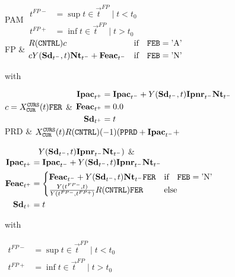 \documentclass[12pt]{book}
\begin{document}
\begin{functions}{PAM}
	{$\begin{aligned}
				t^{FP-} & = \sup t \in \vec{t}^{FP}\mid t<t_0 \\
				t^{FP+} & = \inf t \in \vec{t}^{FP}\mid t>t_0\end{aligned}$} \\
	\hline
	FP & {$\begin{aligned}
					 & R (\texttt{CNTRL}) c                                                  & \text{if} \quad \texttt{FEB}=\text{'A'} \\
					 & cY (\textbf{Sd}_{t^-},t)\textbf{Nt}_{t^-}+\textbf{Feac}_{t^-} & \text{if} \quad \texttt{FEB}=\text{'N'}\end{aligned}$}\par
	with\par
	$c=X_{\texttt{CUR}}^{\texttt{CURS}}(t)\texttt{FER}$
	& {$\begin{aligned}
					\textbf{Ipac}_{t^+} & = \textbf{Ipac}_{t^-} + Y (\textbf{Sd}_{t^-},t)\textbf{Ipnr}_{t^-}\textbf{Nt}_{t^-} \\
					\textbf{Feac}_{t^+} & = 0.0                                                                      \\
					\textbf{Sd}_{t^+}   & = t\end{aligned}$} \\
	\hline
	PRD & $X_{\texttt{CUR}}^{\texttt{CURS}}(t)R (\texttt{CNTRL}) (-1)(\texttt{PPRD} + \textbf{Ipac}_{t^-} +$ \par
		$\qquad\qquad Y (\textbf{Sd}_{t^-},t)\textbf{Ipnr}_{t^-}\textbf{Nt}_{t^-})$
	& {$\begin{aligned}
					\textbf{Ipac}_{t^+} & = \textbf{Ipac}_{t^-} + Y (\textbf{Sd}_{t^-},t)\textbf{Ipnr}_{t^-}\textbf{Nt}_{t^-}                                                          \\
					\textbf{Feac}_{t^+} & = \begin{cases} \textbf{Feac}_{t^-} + Y (\textbf{Sd}_{t^-},t)\textbf{Nt}_{t^-}\texttt{FER} & \text{if} \quad \texttt{FEB}=\text{'N'} \\
              \frac{Y (t^{FP-},t)}{Y (t^{FP-},t^{FP+})}R (\texttt{CNTRL})\texttt{FER}      & \text{else}\end{cases} \\
					\textbf{Sd}_{t^+}   & = t\end{aligned}$} \par
	with\par
	{$\begin{aligned}
				t^{FP-} & = \sup t \in \vec{t}^{FP}\mid t<t_0 \\
				t^{FP+} & = \inf t \in \vec{t}^{FP}\mid t>t_0\end{aligned}$} \\

\end{functions}
\end{document}
